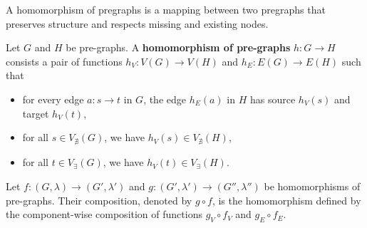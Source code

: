  A homomorphism of pregraphs is a mapping between two pregraphs that preserves structure and respects missing and existing nodes.
 \begin{definition} 
    \label{def:pregraph:homomorphism}
    Let \( G \) and \( H \) be pre-graphs. A \textbf{homomorphism of pre-graphs} $h: G \to H$ consists a pair of functions $h_V: V(G) \to V(H) $ and $h_E: E(G) \to E(H)$ such that
    \begin{itemize}
        \item for every edge \( a \colon s \to t \) in \( G \), the edge \( h_E(a) \) in $H$ has source \( h_V(s) \) and target \( h_V(t) \),
        \item for all $s \in V_{\nexists}(G)$, we have $h_V(s) \in V_{\nexists}(H)$,
        \item for all $t \in V_\exists(G)$, we have $h_V(t) \in V_\exists(H)$.
    \end{itemize} 
\end{definition}

\begin{definition} 
    \label{def:pregraph:composition}
    Let $f: (G,\lambda) \to (G',\lambda')$ and $g: (G',\lambda') \to (G'',\lambda'')$ be homomorphisms of pre-graphs. Their composition, denoted by $g \circ f$, is the homomorphism defined by the component-wise composition of functions $g_V \circ f_V$ and $g_E \circ f_E$.
\end{definition}

